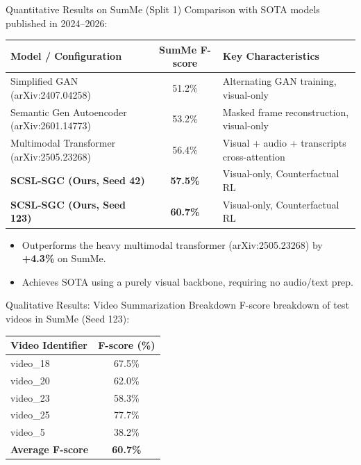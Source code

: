 \documentclass[aspectratio=169]{beamer}
\begin{document}
\begin{frame}{Quantitative Results on SumMe (Split 1)}
    Comparison with SOTA models published in 2024--2026:
    \begin{center}
        \small
        \begin{tabular}{lcl}
            \toprule
            \textbf{Model / Configuration} & \textbf{SumMe F-score} & \textbf{Key Characteristics} \\
            \midrule
            Simplified GAN (arXiv:2407.04258) & 51.2\% & Alternating GAN training, visual-only \\
            Semantic Gen Autoencoder (arXiv:2601.14773) & 53.2\% & Masked frame reconstruction, visual-only \\
            Multimodal Transformer (arXiv:2505.23268) & 56.4\% & Visual + audio + transcripts cross-attention \\
            \midrule
            \textbf{SCSL-SGC (Ours, Seed 42)} & \textbf{57.5\%} & Visual-only, Counterfactual RL \\
            \textbf{SCSL-SGC (Ours, Seed 123)} & \textbf{60.7\%} & Visual-only, Counterfactual RL \\
            \bottomrule
        \end{tabular}
    \end{center}
    \begin{itemize}
        \item Outperforms the heavy multimodal transformer (arXiv:2505.23268) by \textbf{+4.3\%} on SumMe.
        \item Achieves SOTA using a purely visual backbone, requiring no audio/text prep.
    \end{itemize}
\end{frame}

\begin{frame}{Qualitative Results: Video Summarization Breakdown}
    F-score breakdown of test videos in SumMe (Seed 123):
    \begin{center}
        \begin{tabular}{lc}
            \toprule
            \textbf{Video Identifier} & \textbf{F-score (\%)} \\
            \midrule
            video\_18 & 67.5\% \\
            video\_20 & 62.0\% \\
            video\_23 & 58.3\% \\
            video\_25 & 77.7\% \\
            video\_5 & 38.2\% \\
            \midrule
            \textbf{Average F-score} & \textbf{60.7\%} \\
            \bottomrule
        \end{tabular}
    \end{center}
\end{frame}
\end{document}
